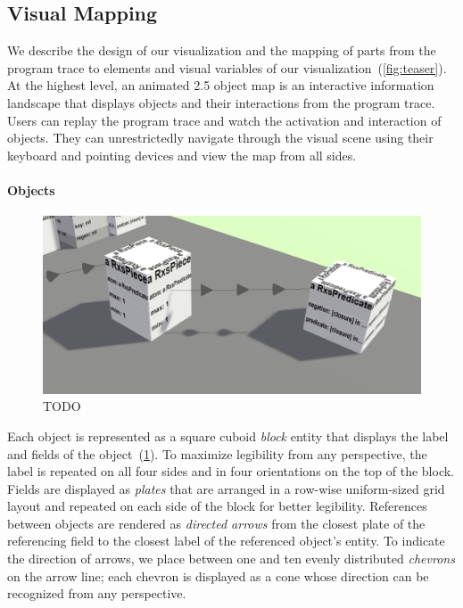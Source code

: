 \subsection{Visual Mapping}
\label{sec:visualization_approach/mapping}

We describe the design of our visualization and the mapping of parts from the program trace to elements and visual variables of our visualization~(\cref{fig:teaser}).
At the highest level, an animated 2.5 object map is an interactive information landscape that displays objects and their interactions from the program trace.
Users can replay the program trace and watch the activation and interaction of objects.
They can unrestrictedly navigate through the visual scene using their keyboard and pointing devices and view the map from all sides.

\paragraph{Objects}
\label{sec:visualization_approach/mapping/objects}

\begin{figure}
	\includegraphics[width=\linewidth]{sections/03_visualization_approach/mapping/objects}
	\caption{TODO}
	\label{fig:visualization_approach/mapping/objects}
\end{figure}

Each object is represented as a square cuboid \emph{block} entity that displays the label and fields of the object~(\cref{fig:visualization_approach/mapping/objects}).
To maximize legibility from any perspective, the label is repeated on all four sides and in four orientations on the top of the block.
Fields are displayed as \emph{plates} that are arranged in a row-wise uniform-sized grid layout and repeated on each side of the block for better legibility.
References between objects are rendered as \emph{directed arrows} from the closest plate of the referencing field to the closest label of the referenced object's entity.
To indicate the direction of arrows, we place between one and ten evenly distributed \emph{chevrons} on the arrow line; each chevron is displayed as a cone whose direction can be recognized from any perspective.

